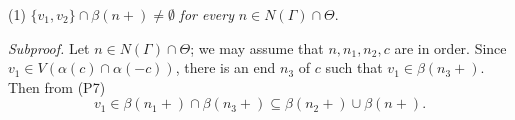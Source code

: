 \hspace*{12pt}(1) $\{v_1, v_2\} \cap \beta(n +) \ne \emptyset$ \textit{for every} $n \in N(\Gamma) \cap \Theta$.

\textit{Subproof.} Let $n \in N(\Gamma) \cap \Theta$; we may assume that $n, n_1, n_2, c$ are in order. Since $v_1 \in V(\alpha(c) \cap \alpha(-c))$, there is an end $n_3$ of $c$ such that $v_1 \in \beta(n_3 +)$. Then from (P7)
\begin{equation*}
v_1 \in \beta(n_1 +) \cap \beta(n_3 +) \subseteq \beta(n_2 +) \cup \beta(n +).
\end{equation*}
